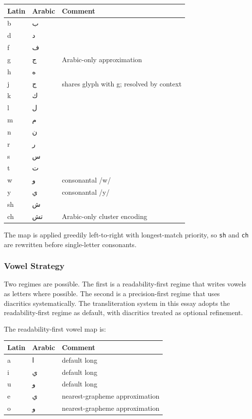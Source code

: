 \documentclass[12pt]{article}
\begin{document}
\begin{center}
\begin{tabular}{lll}
Latin & Arabic & Comment \\
\hline
b & ب & \\
d & د & \\
f & ف & \\
g & ج & Arabic-only approximation \\
h & ه & \\
j & ج & shares glyph with g; resolved by context \\
k & ك & \\
l & ل & \\
m & م & \\
n & ن & \\
r & ر & \\
s & س & \\
t & ت & \\
w & و & consonantal /w/ \\
y & ي & consonantal /y/ \\
sh & ش & \\
ch & تش & Arabic-only cluster encoding \\
\end{tabular}
\end{center}

The map is applied greedily left-to-right with longest-match priority, so \texttt{sh} and \texttt{ch} are rewritten before single-letter consonants.

\subsubsection{Vowel Strategy}

Two regimes are possible. The first is a readability-first regime that writes vowels as letters where possible. The second is a precision-first regime that uses diacritics systematically. The transliteration system in this essay adopts the readability-first regime as default, with diacritics treated as optional refinement.

The readability-first vowel map is:

\begin{center}
\begin{tabular}{lll}
Latin & Arabic & Comment \\
\hline
a & ا & default long \\
i & ي & default long \\
u & و & default long \\
e & ي & nearest-grapheme approximation \\
o & و & nearest-grapheme approximation \\
\end{tabular}
\end{center}
\end{document}
